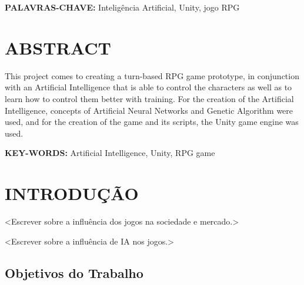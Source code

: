 \documentclass[12pt,a4paper]{article}
\begin{document}
	\vspace{0.8cm}
	\noindent
	\textbf{PALAVRAS-CHAVE:} Inteligência Artificial, Unity, jogo RPG

\onehalfspacing

\newpage %
\thispagestyle{empty} %
\section*{\hfil ABSTRACT} %
	\singlespace
	\noindent
	This project comes to creating a turn-based RPG game prototype,
	in conjunction with an Artificial Intelligence that is able to control the characters
	as well as to learn how to control them better with training.
	For the creation of the Artificial Intelligence,
	concepts of Artificial Neural Networks and Genetic Algorithm were used,
	and for the creation of the game and its scripts,
	the Unity game engine was used.
	
	\vspace{0.8cm}
	\noindent
	\textbf{KEY-WORDS:} Artificial Intelligence, Unity, RPG game

\onehalfspacing

\newpage %
\thispagestyle{empty} %
\listoffigures %

\newpage %
\thispagestyle{empty} %
\listoftables %

\newpage %
\thispagestyle{empty} %
\tableofcontents %

\newpage %
\section{INTRODUÇÃO}
	<Escrever sobre a influência dos jogos na sociedade e mercado.>
	
	<Escrever sobre a influência de IA nos jogos.>

	\subsection{Objetivos do Trabalho}
	
\end{document}
